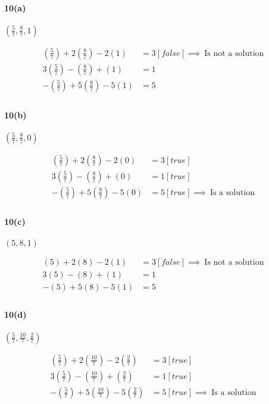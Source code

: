 \documentclass[a4paper,11pt,twoside]{report}
\begin{document}
\paragraph{10(a)} $\left( \frac{5}{7}, \frac{8}{7}, 1 \right) $

\begin{align*}
	\left( \frac{5}{7} \right)  + 2\left( \frac{8}{7} \right)  - 2(1) &=  3 [false] \implies \boxed{\:\text{Is not a solution}\:} \\
	3\left( \frac{5}{7} \right) - \left( \frac{8}{7} \right) +(1) &= 1 \\
	-\left( \frac{5}{7} \right) + 5\left( \frac{8}{7} \right) - 5(1) &= 5 \\
\end{align*}

\paragraph{10(b)} $\left( \frac{5}{7}, \frac{8}{7}, 0 \right) $

\begin{align*}
	\left( \frac{5}{7} \right)  + 2\left( \frac{8}{7} \right)  - 2(0) &=  3 [true] \\
	3\left( \frac{5}{7} \right) - \left( \frac{8}{7} \right) +(0) &= 1 [true]\\
	-\left( \frac{5}{7} \right) + 5\left( \frac{8}{7} \right) - 5(0) &= 5 [true] \implies \boxed{\:\text{Is a solution}\:}\\
\end{align*}

\paragraph{10(c)} $(5,8,1)$

\begin{align*}
	(5) + 2(8) - 2(1) &=  3 [false] \implies \boxed{\:\text{Is not a solution}\:} \\
	3(5) - (8) + (1) &= 1 \\
	-(5) + 5(8) - 5(1) &= 5 \\
\end{align*}

\paragraph{10(d)} $\left( \frac{5}{7}, \frac{10}{7}, \frac{2}{7} \right) $

\begin{align*}
	\left( \frac{5}{7} \right)  + 2 \left( \frac{10}{7} \right)  - 2\left( \frac{2}{7} \right)  &=  3 [true]\\
	3\left( \frac{5}{7} \right)  - \left( \frac{10}{7} \right) + \left( \frac{2}{7} \right) &= 1[true] \\
	-\left( \frac{5}{7} \right)  + 5\left( \frac{10}{7} \right) - 5\left( \frac{2}{7} \right) &= 5[true] \implies \boxed{\:\text{Is a solution}\:}\\
\end{align*}
\end{document}
